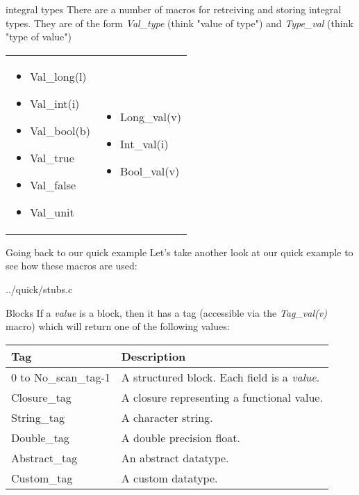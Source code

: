 \documentclass{beamer}
\begin{document}
\begin{frame}{integral types}
There are a number of macros for retreiving and storing integral types.
They are of the form \emph{Val\_type} (think "value of type") and \emph{Type\_val} (think "type of value")
\begin{tabular}{p{}p{}}
    \begin{itemize}
        \item Val\_long(l)
        \item Val\_int(i)
        \item Val\_bool(b)
        \item Val\_true
        \item  Val\_false
        \item Val\_unit
    \end{itemize} &
    \begin{itemize}
        \item Long\_val(v)
        \item Int\_val(i)
        \item Bool\_val(v)
    \end{itemize} \\
\end{tabular}
\end{frame}

\begin{frame}[fragile]{Going back to our quick example}
Let's take another look at our quick example to see how these macros are used:
\begin{lstinputlisting}[language=C]{../quick/stubs.c}
\end{lstinputlisting}
\end{frame}

\begin{frame}{Blocks}
If a \emph{value} is a block, then it has a tag (accessible via the \emph{Tag\_val(v)} macro) which will
return one of the following values:
\begin{tabular}{| l | l |} \hline
    Tag & Description \\ \hline\hline
    0 to No\_scan\_tag-1 & A structured block.  Each field is a \emph{value}. \\ \hline
    Closure\_tag & A closure representing a functional value. \\ \hline
    String\_tag & A character string. \\ \hline
    Double\_tag & A double precision float. \\ \hline
    Abstract\_tag & An abstract datatype. \\ \hline
    Custom\_tag & A custom datatype. \\ \hline
\end{tabular}
\end{frame}
\end{document}
